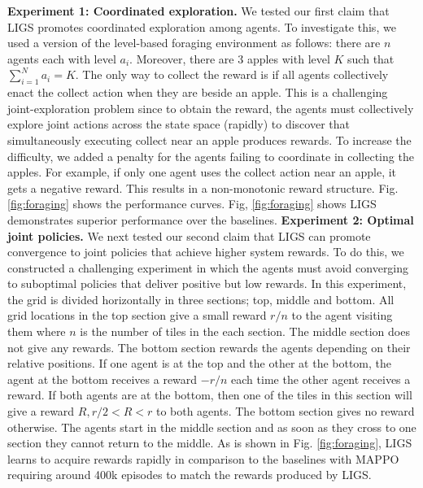 \documentclass{article}
\begin{document}
\textbf{Experiment 1: Coordinated exploration.} We tested our first claim that LIGS promotes coordinated exploration among agents. To investigate this, we used a version of the level-based foraging environment \cite{papoudakis2020comparative} as follows: there are $n$ agents each with level $a_i$. Moreover, there are 3 apples with level $K$ such that $\sum_{i=1}^N a_i = K$. The only way to collect the reward is if all agents collectively enact the {\selectfont collect} action when they are beside an apple. This is a challenging joint-exploration problem since to obtain the reward, the agents must collectively explore joint actions across the state space (rapidly) to discover that simultaneously executing {\selectfont collect} near an apple produces rewards. To increase the difficulty, we added a penalty for the agents failing to coordinate in collecting the apples. For example, if only one agent uses the {\selectfont collect} action near an apple, it gets a negative reward. This results in a non-monotonic reward structure. Fig. \ref{fig:foraging} shows the performance curves.
Fig, \ref{fig:foraging} shows LIGS demonstrates superior performance over the baselines.\newline 
% 
% 
\textbf{Experiment 2: Optimal joint policies. }
We next tested our second claim that LIGS can promote convergence to joint policies that achieve higher system rewards. To do this, we constructed a challenging experiment in which the agents must avoid converging to suboptimal policies that deliver positive but low rewards. In this experiment, the grid is divided horizontally in three sections; top, middle and bottom. All grid locations in the top section give a small reward $r/n$ to the agent visiting them where $n$ is the number of tiles in the each section. The middle section does not give any rewards. The bottom section rewards the agents depending on their relative positions. If one agent is at the top and the other at the bottom, the agent at the bottom receives a reward $-r/n$ each time the other agent receives a reward. If both agents are at the bottom, then one of the tiles in this section will give a reward $R, r/2<R<r$ to both agents. The bottom section gives no reward otherwise. The agents start in the middle section and as soon as they cross to one section they cannot return to the middle. As is shown in Fig. \ref{fig:foraging}, LIGS learns to acquire rewards rapidly in comparison to the baselines with MAPPO requiring around 400k episodes to match the rewards produced by LIGS. \newline 
\end{document}
